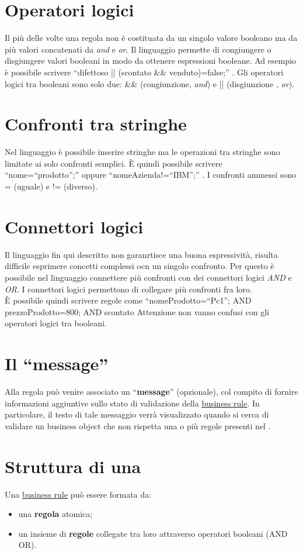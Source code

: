 \begin{center}
\section{Operatori logici}
Il pi\`u delle volte una regola non \`e costituata da un singolo valore booleano ma da pi\`u valori concatenati da \textit{and} e \textit{or}. Il linguaggio permette di congiungere o disgiungere valori booleani in modo da ottenere espressioni booleane. Ad esempio \`e possibile scrivere ``difettoso || (scontato \&\& venduto)=false;'' . Gli operatori logici tra booleani sono solo due: \&\& (congiunzione, \textit{and}) e || (disgiunzione , \textit{or}).

\section{Confronti tra stringhe}
Nel linguaggio \`e possibile inserire stringhe ma le operazioni tra stringhe sono limitate ai solo confronti semplici. \`E quindi possibile scrivere ``nome=``prodotto'';'' oppure ``nomeAzienda!=``IBM'';'' . I confronti ammessi sono = (uguale) e != (diverso).

\section{Connettori logici}
Il linguaggio fin qui descritto non garanrtisce una buona espressivit\`a, risulta difficile esprimere concetti complessi ocn un singolo confronto. Per questo \`e possibile nel linguaggio connettere pi\`u confronti con dei connettori logici \textit{AND} e \textit{OR}. I connettori logici permettono di collegare pi\`u confronti fra loro.\\
\`E possibile quindi scrivere regole come ``nomeProdotto=``Pc1''; AND prezzoProdotto=800; AND scontato Attenzione non vanno confusi con gli operatori logici tra booleani.
\section{Il ``message''}

Alla regola pu\`o venire associato un ``\textbf{message}'' (opzionale), col compito di fornire informazioni aggiuntive sullo stato di validazione della \underline{business rule}. In particolare, il testo di tale messaggio verr\`a visualizzato quando si cerca di validare un business object che non rispetta una o pi\`u regole presenti nel \rp.

 \section{Struttura di una \br}
 Una \underline{business rule} pu\`o essere formata da:
 \begin{itemize}
 \item una \textbf{regola} atomica;
 \item un insieme di \textbf{regole} collegate tra loro attraverso operatori booleani (AND \textbar OR).
 \end{itemize}
 



\end{center}
